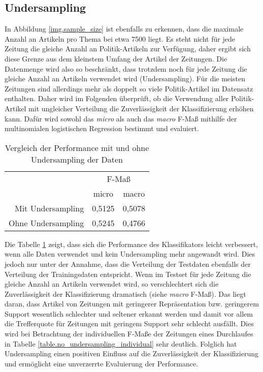 \subsection{Undersampling}
In Abbildung \ref{img.sample_size} ist ebenfalls zu erkennen, dass die maximale Anzahl an Artikeln pro Thema bei etwa 7500 liegt. Es steht nicht für jede Zeitung die gleiche Anzahl an Politik-Artikeln zur Verfügung, daher ergibt sich diese Grenze aus dem kleinstem Umfang der Artikel der Zeitungen. Die Datenmenge wird also so beschränkt, dass trotzdem noch für jede Zeitung die gleiche Anzahl an Artikeln verwendet wird (Undersampling). Für die meisten Zeitungen sind allerdings mehr als doppelt so viele Politik-Artikel im Datensatz enthalten. Daher wird im Folgenden überprüft, ob die Verwendung aller Politik-Artikel mit ungleicher Verteilung die Zuverlässigkeit der Klassifizierung erhöhen kann. Dafür wird sowohl das \textit{micro} als auch das \textit{macro} F-Maß mithilfe der multinomialen logistischen Regression bestimmt und evaluiert.

\begin{table}[h]
\centering
\begin{spacing}{1.25}
\begin{tabular}[t]{rcc}
\toprule
~ & \multicolumn{2}{c}{F-Maß}\\
~ & micro & macro\\
Mit Undersampling & 0,5125 & 0,5078\\
Ohne Undersampling & 0,5245 & 0,4766\\
\bottomrule
\end{tabular}
\caption{Vergleich der Performance mit und ohne Undersampling der Daten}
\label{table.undersampling}
\end{spacing}
\end{table}

Die Tabelle \ref{table.undersampling} zeigt, dass sich die Performance des Klassifikators leicht verbessert, wenn alle Daten verwendet und kein Undersampling mehr angewandt wird. Dies jedoch nur unter der Annahme, dass die Verteilung der Testdaten ebenfalls der Verteilung der Trainingsdaten entspricht. Wenn im Testset für jede Zeitung die gleiche Anzahl an Artikeln verwendet wird, so verschlechtert sich die Zuverlässigkeit der Klassifizierung dramatisch (siehe \textit{macro} F-Maß). Das liegt daran, dass Artikel von Zeitungen mit geringerer Repräsentation bzw. geringerem Support wesentlich schlechter und seltener erkannt werden und damit vor allem die Trefferquote für Zeitungen mit geringem Support sehr schlecht ausfällt. Dies wird bei Betrachtung der individuellen F-Maße der Zeitungen eines Durchlaufes in Tabelle \ref{table.no_undersampling_individual} sehr deutlich. Folglich hat Undersampling einen positiven Einfluss auf die Zuverlässigkeit der Klassifizierung und ermöglicht eine unverzerrte Evaluierung der Performance.

